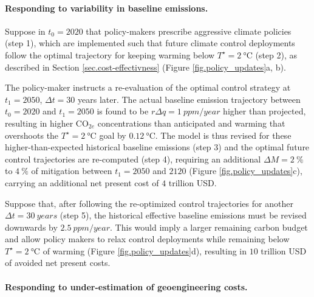 \documentclass{article}
\begin{document}

\paragraph{Responding to variability in baseline emissions.}
Suppose in $t_{0} = 2020$ that policy-makers prescribe aggressive climate policies (step 1), which are implemented such that future climate control deployments follow the optimal trajectory for keeping warming below $T^{\star} = \SI{2}{\celsius}$ (step 2), as described in Section \ref{sec.cost-effectivness} (Figure \ref{fig.policy_updates}a, b). 

The policy-maker instructs a re-evaluation of the optimal control strategy at $t_{1} = 2050$, $\Delta t = 30$ years later. The actual baseline emission trajectory between $t_{0}=2020$ and $t_{1}=2050$ is found to be $r\Delta q = \SI{1}{ppm/year}$ higher than projected, resulting in higher CO$_{2e}$ concentrations than anticipated and warming that overshoots the $T^{\star} = \SI{2}{\celsius}$ goal by $\SI{0.12}{\celsius}$. The model is thus revised for these higher-than-expected historical baseline emissions (step 3) and the optimal future control trajectories are re-computed (step 4), requiring an additional $\Delta M = \SI{2}{\%}$ to $\SI{4}{\%}$ of mitigation between $t_{1} = 2050$ and $2120$ (Figure \ref{fig.policy_updates}c), carrying an additional net present cost of $4$ trillion USD.

Suppose that, after following the re-optimized control trajectories for another $\Delta t = \SI{30}{years}$ (step 5), the historical effective baseline emissions must be revised downwards by $\SI{2.5}{ppm/year}$. This would imply a larger remaining carbon budget \citep{millar_cumulative_2016} and allow policy makers to relax control deployments while remaining below $T^{\star} = \SI{2}{\celsius}$ of warming (Figure \ref{fig.policy_updates}d), resulting in $10$ trillion USD of avoided net present costs.

\paragraph{Responding to under-estimation of geoengineering costs.}
\end{document}
